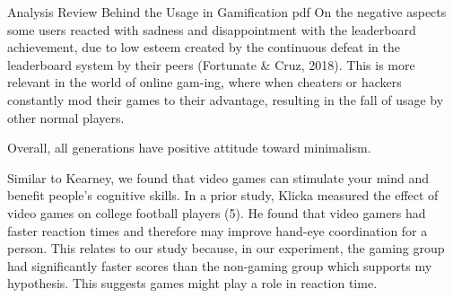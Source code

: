 \documentclass[]{VUMIFTemplateClass}
\newcommand{\ee}{{\mathrm e}}  %
\newcommand{\RR}{\mathbb{R}}
\begin{document}
Analysis Review Behind the Usage in Gamification pdf
On the negative aspects some users reacted with sadness
and disappointment with the leaderboard achievement, due
to low esteem created by the continuous defeat in the
leaderboard system by their peers (Fortunate \& Cruz, 2018).
This is more relevant in the world of online gam-ing, where
when cheaters or hackers constantly mod their games to their
advantage, resulting in the fall of usage by other normal
players. \cite{GamificationInEducation}


Overall, all generations have positive attitude toward minimalism. \cite{GamificationInMarketing}

Similar to Kearney, we found that video games can stimulate your mind and benefit people’s cognitive skills. In a prior study, Klicka measured the effect of video games on college football players (5). He found that video gamers had faster reaction times and therefore may improve hand-eye coordination for a person. This relates to our study because, in our
experiment, the gaming group had significantly faster scores than the non-gaming group which supports my hypothesis. This suggests games might play a role in reaction time. \cite{ReactionTime}





\end{document}
